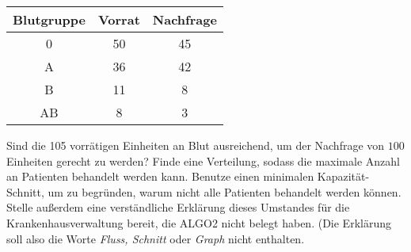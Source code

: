 \documentclass{uebung_cs}
\begin{document}
\begin{aufgabe}[Blutspende]
\begin{enumerate}
    	\vspace{4mm}
    	\begin{center}
    	\begin{tabular}{|c|c|c|}
    	\hline 
    	Blutgruppe & Vorrat & Nachfrage \\ 
    	\hline 
    	0 & 50 & 45 \\ 
    	\hline 
    	A & 36 & 42 \\ 
    	\hline 
    	B & 11 & 8 \\ 
    	\hline 
    	AB & 8 & 3 \\ 
    	\hline 
    	\end{tabular}
    	\end{center}
    	\vspace{4mm}
    	Sind die 105 vorrätigen Einheiten an Blut ausreichend, um der Nachfrage von $100$ Einheiten gerecht zu werden? Finde eine Verteilung, sodass die maximale Anzahl an Patienten behandelt werden kann. Benutze einen minimalen Kapazität-Schnitt, um zu begründen, warum nicht alle Patienten behandelt werden können. Stelle außerdem eine verständliche Erklärung dieses Umstandes für die Krankenhausverwaltung bereit, die ALGO2 nicht belegt haben. (Die Erklärung soll also die Worte \textit{Fluss, Schnitt} oder \textit{Graph} nicht enthalten.
    \end{enumerate}
\end{aufgabe}
\end{document}
